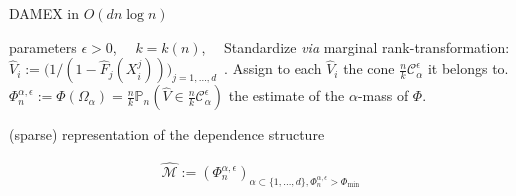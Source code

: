 \documentclass[10pt]{beamer}
\begin{document}
\begin{frame}
\begin{center}


\begin{algorithmic} 
DAMEX in $O(dn\log n)$

 parameters $\epsilon>0$,~~ $k = k(n)$,~~ %
\STATE Standardize \emph{via} marginal rank-transformation: $\hat V_i := \big (1/(1- \hat F_j (X_i^j))\big)_{j=1,\ldots,d}$~. 
\STATE Assign to each $\hat V_i$ the cone $\frac{n}{k}\mathcal{C}_\alpha^\epsilon$
  it belongs to.  
\STATE $\Phi_n^{\alpha,\epsilon} := \widehat{\Phi}(\Omega_\alpha) = \frac{n}{k}\mathbb{P}_n( \hat V \in \frac{n}{k}\mathcal{C}_\alpha^\epsilon)$
the estimate of the $\alpha$-mass of $\Phi$.
   
 (sparse) representation of the dependence
  structure %

\begin{align*}
\widehat{\mathcal{M}} := (\Phi_n^{\alpha,\epsilon})_{\alpha\subset\{1,\ldots, d\}, \Phi_n^{\alpha,\epsilon}>\Phi_{\min}}
\end{align*}

\end{algorithmic}

\end{center}
\end{frame}
\end{document}
